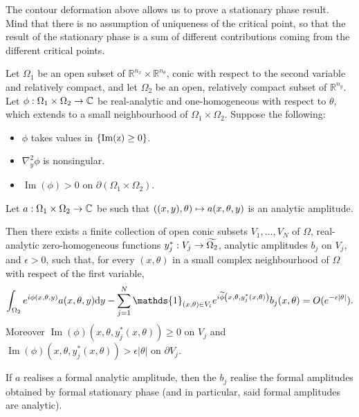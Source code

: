 \documentclass[AHL,Unicode,longabstracts,published]{cedram}
\DeclareMathOperator{\im}{Im}
\newcommand\1{\mathds{1}}
\newcommand{\R}{\mathbb{R}}
\newcommand{\C}{\mathbb{C}}
\newcommand{\dd}{\mathrm{d}}
\renewcommand*{\to}{\mathchoice{\longrightarrow}{\rightarrow}{\rightarrow}{\rightarrow}}
\let\oldmapsto\mapsto
\renewcommand*{\mapsto}{\mathchoice{\longmapsto}{\oldmapsto}{\oldmapsto}{\oldmapsto}}
\let\originalleft\left
\let\originalright\right
\renewcommand{\left}{\mathopen{}\mathclose\bgroup\originalleft}
\renewcommand{\right}{\aftergroup\egroup\originalright}
\begin{document}
The contour deformation above allows us to prove a stationary phase result. Mind that there is no assumption of uniqueness of the critical point, so that the result of the stationary phase is a sum of different contributions coming from the different critical points.

\begin{prop}\label{prop:stat_phase}
Let $\Omega_1$ be an open subset of $\R^{n_{x}}\times
\R^{n_{\theta}}$, conic with respect to the second variable and relatively compact, and let $\Omega_2$ be an open, relatively compact subset of $\R^{n_y}$. Let $\phi:\Omega_1\times \Omega_2\to \C$ be real-analytic and one-homogeneous with respect to $\theta$, which extends to a small neighbourhood of $\Omega_1\times \Omega_2$. Suppose the following:
\begin{itemize}
\item $\phi$ takes values in $\{{\rm Im(z)}\geq 0\}$.
\item $\nabla^2_y\phi$ is nonsingular.
\item $\im(\phi)>0$ on $\partial(\Omega_1\times \Omega_2)$.
\end{itemize}

Let $a:\Omega_1\times \Omega_2\to \C$ be such that $((x,y),\theta)\mapsto a(x,\theta,y)$ is an analytic amplitude.

Then there exists a finite collection of open conic subsets $V_1,\dots,V_N$ of $\Omega$, real-analytic zero-homogeneous functions $y^*_j:V_j\to
\widetilde{\Omega_2}$, analytic amplitudes $b_j$ on $V_j$, and $\epsilon>0$, such that, for every $(x,\theta)$ in a small complex neighbourhood of $\Omega$ with respect of the first variable,
\[
\int_{\Omega_2}e^{i\phi(x,\theta,y)}a(x,\theta,y)\dd y -
\sum_{j=1}^N\1_{(x,\theta)\in V_i}e^{i\widetilde{\phi}\left(x,\theta,y^*_j(x,\theta)\right)}b_j(x,\theta)=O(e^{-\epsilon|\theta|}).
\]
Moreover $\im(\phi)(x,\theta,y^*_j(x,\theta))\geq 0$ on $V_j$ and $\im(\phi)(x,\theta,y^*_j(x,\theta))>\epsilon|\theta|$ on $\partial V_j$.


If $a$ realises a formal analytic amplitude, then the $b_j$ realise the formal amplitudes obtained by formal stationary phase (and in particular, said formal amplitudes are analytic).
\end{prop}
\end{document}
